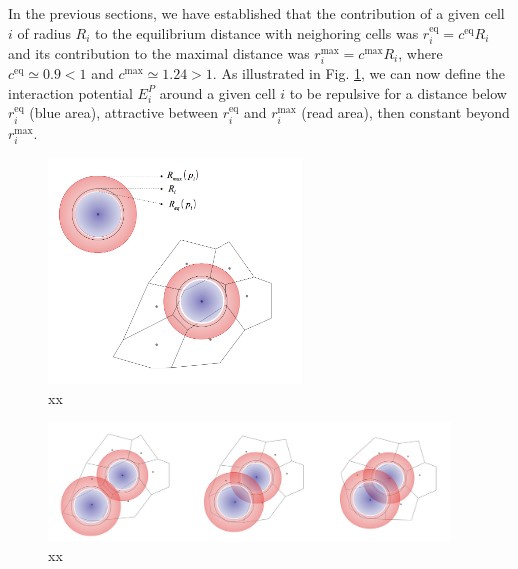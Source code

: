 In the previous sections, we have established that the contribution of a given cell $i$ of radius $R_i$ to the equilibrium distance with neighoring cells was $r^{\mathrm{eq}}_i = c^{\mathrm{eq}}R_i$ and its contribution to the maximal distance was $r^{\mathrm{max}}_i = c^{\mathrm{max}}R_i$, where $c^{\mathrm{eq}} \simeq 0.9 \lt 1$ and $c^{\mathrm{max}} \simeq 1.24 \gt 1$. As illustrated in Fig. \ref{potential_surface_distance_why_potential}, we can now define the interaction potential $E^P_i$ around a given cell $i$ to be repulsive for a distance below $r^{\mathrm{eq}}_i$ (blue area), attractive between $r^{\mathrm{eq}}_i$ and $r^{\mathrm{max}}_i$ (read area), then constant beyond $r^{\mathrm{max}}_i$.
\begin{figure}
\begin{center}
\includegraphics[width=0.6\textwidth]{../../images/MECAGEN/potential/surface_distance_why_potential.png}
\end{center}
\caption{xx}
\label{potential_surface_distance_why_potential}
\end{figure}
\begin{figure}
\begin{center}
\includegraphics[width=0.95\textwidth]{../../images/MECAGEN/potential/surface_distance_why_potential_rep_eq_adh.png}
\end{center}
\caption{xx}
\label{potential_surface_distance_why_potential_rep_eq_adh}
\end{figure}

